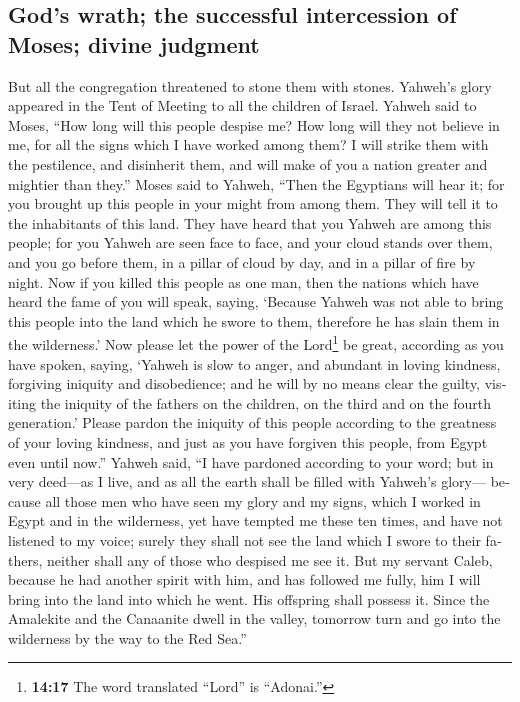 \begin{paracol}{2}
\begin{otherlanguage}{english}
{\subsection{God's wrath; the successful intercession of Moses; divine
judgment}\label{gods-wrath-the-successful-intercession-of-moses-divine-judgment}}

 But all the congregation threatened to stone them with
stones. Yahweh's glory appeared in the Tent of Meeting to all the
children of Israel.  Yahweh said to Moses, ``How long
will this people despise me? How long will they not believe in me, for
all the signs which I have worked among them?  I will
strike them with the pestilence, and disinherit them, and will make of
you a nation greater and mightier than they.''  Moses
said to Yahweh, ``Then the Egyptians will hear it; for you brought up
this people in your might from among them.  They will
tell it to the inhabitants of this land. They have heard that you Yahweh
are among this people; for you Yahweh are seen face to face, and your
cloud stands over them, and you go before them, in a pillar of cloud by
day, and in a pillar of fire by night.  Now if you killed
this people as one man, then the nations which have heard the fame of
you will speak, saying,  `Because Yahweh was not able to
bring this people into the land which he swore to them, therefore he has
slain them in the wilderness.'  Now please let the power
of the Lord\footnote{\textbf{14:17} The word translated ``Lord'' is
  ``Adonai.''} be great, according as you have spoken, saying,
 `Yahweh is slow to anger, and abundant in loving
kindness, forgiving iniquity and disobedience; and he will by no means
clear the guilty, visiting the iniquity of the fathers on the children,
on the third and on the fourth generation.'  Please
pardon the iniquity of this people according to the greatness of your
loving kindness, and just as you have forgiven this people, from Egypt
even until now.''  Yahweh said, ``I have pardoned
according to your word;  but in very deed---as I live,
and as all the earth shall be filled with Yahweh's glory---
 because all those men who have seen my glory and my
signs, which I worked in Egypt and in the wilderness, yet have tempted
me these ten times, and have not listened to my voice; 
surely they shall not see the land which I swore to their fathers,
neither shall any of those who despised me see it.  But
my servant Caleb, because he had another spirit with him, and has
followed me fully, him I will bring into the land into which he went.
His offspring shall possess it.  Since the Amalekite and
the Canaanite dwell in the valley, tomorrow turn and go into the
wilderness by the way to the Red Sea.''


\end{otherlanguage}
\end{paracol}
